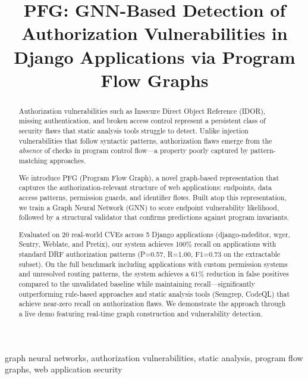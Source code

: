 \documentclass[conference]{IEEEtran}
\begin{document}
\title{PFG: GNN-Based Detection of Authorization Vulnerabilities in Django Applications via Program Flow Graphs}

\author{
}

\maketitle

\begin{abstract}
Authorization vulnerabilities such as Insecure Direct Object Reference (IDOR), missing authentication, and broken access control represent a persistent class of security flaws that static analysis tools struggle to detect. Unlike injection vulnerabilities that follow syntactic patterns, authorization flaws emerge from the \emph{absence} of checks in program control flow—a property poorly captured by pattern-matching approaches.

We introduce PFG (Program Flow Graph), a novel graph-based representation that captures the authorization-relevant structure of web applications: endpoints, data access patterns, permission guards, and identifier flows. Built atop this representation, we train a Graph Neural Network (GNN) to score endpoint vulnerability likelihood, followed by a structural validator that confirms predictions against program invariants.

Evaluated on 20 real-world CVEs across 5 Django applications (django-mdeditor, wger, Sentry, Weblate, and Pretix), our system achieves 100\% recall on applications with standard DRF authorization patterns (P=0.57, R=1.00, F1=0.73 on the extractable subset). On the full benchmark including applications with custom permission systems and unresolved routing patterns, the system achieves a 61\% reduction in false positives compared to the unvalidated baseline while maintaining recall---significantly outperforming rule-based approaches and static analysis tools (Semgrep, CodeQL) that achieve near-zero recall on authorization flaws. We demonstrate the approach through a live demo featuring real-time graph construction and vulnerability detection.
\end{abstract}

\begin{IEEEkeywords}
graph neural networks, authorization vulnerabilities, static analysis, program flow graphs, web application security
\end{IEEEkeywords}
\end{document}
